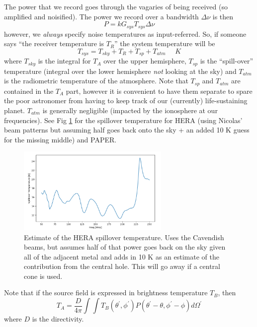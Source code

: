 \documentclass[11pt]{article}
\begin{document}
The power that we record goes through the vagaries of being received (so amplified and noisified).  The power we record over a bandwidth $\Delta\nu$ is then
\begin{equation}
P = kG_{sys}T_{sys}\Delta\nu
\end{equation}
however, we {\em always} specify noise temperatures as input-referred.  So, if someone says ``the receiver temperature is $T_R$'' 
the system temperature will be 
\begin{equation}
T_{sys} = T_{sky} + T_R + T_{sp} + T_{atm} ~~~~~~K 
\end{equation}
where $T_{sky}$ is the integral for $T_A$ over the upper hemisphere, $T_{sp}$ is the ``spill-over'' temperature (integral over the lower hemisphere {\em not} looking at the sky) and $T_{atm}$ is the radiometric temperature of the atmosphere.  Note that $T_{sp}$ and $T_{atm}$ are contained in the $T_A$ part, however it is convenient to have them separate to spare the poor astronomer from having to keep track of our (currently) life-sustaining planet.  $T_{atm}$ is generally negligible (impacted by the ionosphere at our frequencies).  See Fig \ref{Fig:Tspill} for the spillover temperature for HERA (using Nicolas' beam patterns but assuming half goes back onto the sky + an added 10 K guess for the missing middle) and PAPER.

\begin{figure}[ht]
\centering
\includegraphics[width=0.65\textwidth]{spillover.png}
\caption{\small Estimate of the HERA spillover temperature.  Uses the Cavendish beams, but assumes half of that power goes back on the sky given all of the adjacent metal and adds in 10 K as an estimate of the contribution from the central hole.  This will go away if a central cone is used.}
\label{Fig:Tspill}
\end{figure}

Note that if the source field is expressed in brightness temperature $T_B$, then
\begin{equation}
\label{Eq:TA}
T_A =  \frac{D}{4\pi}\int \int T_B(\theta^\prime,\phi^\prime)P(\theta^\prime-\theta,\phi^\prime-\phi)d\Omega^\prime
\end{equation}
where $D$ is the directivity.
\end{document}
